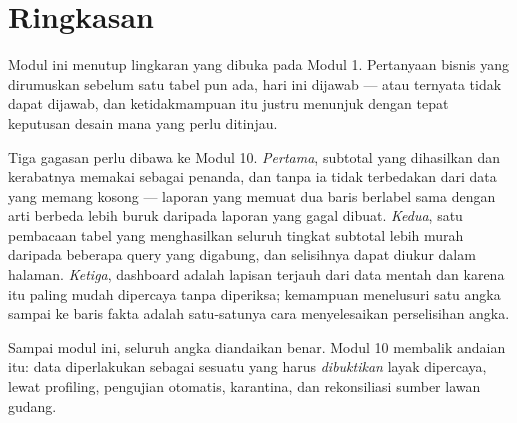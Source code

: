 \section{Ringkasan}

Modul ini menutup lingkaran yang dibuka pada Modul 1. Pertanyaan bisnis yang
dirumuskan sebelum satu tabel pun ada, hari ini dijawab --- atau ternyata tidak
dapat dijawab, dan ketidakmampuan itu justru menunjuk dengan tepat keputusan
desain mana yang perlu ditinjau.

Tiga gagasan perlu dibawa ke Modul 10. \emph{Pertama}, subtotal yang dihasilkan
 dan kerabatnya memakai  sebagai penanda, dan
tanpa  ia tidak terbedakan dari data yang memang kosong ---
laporan yang memuat dua baris berlabel sama dengan arti berbeda lebih buruk
daripada laporan yang gagal dibuat. \emph{Kedua}, satu pembacaan tabel yang
menghasilkan seluruh tingkat subtotal lebih murah daripada beberapa query yang
digabung, dan selisihnya dapat diukur dalam halaman. \emph{Ketiga}, dashboard
adalah lapisan terjauh dari data mentah dan karena itu paling mudah dipercaya
tanpa diperiksa; kemampuan menelusuri satu angka sampai ke baris fakta adalah
satu-satunya cara menyelesaikan perselisihan angka.

Sampai modul ini, seluruh angka diandaikan benar. Modul 10 membalik andaian
itu: data diperlakukan sebagai sesuatu yang harus \emph{dibuktikan} layak
dipercaya, lewat profiling, pengujian otomatis, karantina, dan rekonsiliasi
sumber lawan gudang.
